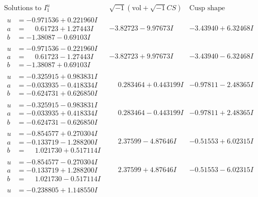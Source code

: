 \documentclass[1p]{elsarticle_modified}
\theoremstyle{definition}
\newcommand{\I}{\sqrt{-1}}
\begin{document}
$$\begin{array}{c|c|c}  
\text{Solutions to }I^u_{1}& \I (\text{vol} + \sqrt{-1}CS) & \text{Cusp shape}\\
 \hline 
\begin{aligned}
u &= -0.971536 + 0.221960 I \\
a &= \phantom{-}0.61723 + 1.27443 I \\
b &= -1.38087 - 0.69103 I\end{aligned}
 & -3.82723 - 9.97673 I & -3.43940 + 6.32468 I \\ \hline\begin{aligned}
u &= -0.971536 - 0.221960 I \\
a &= \phantom{-}0.61723 - 1.27443 I \\
b &= -1.38087 + 0.69103 I\end{aligned}
 & -3.82723 + 9.97673 I & -3.43940 - 6.32468 I \\ \hline\begin{aligned}
u &= -0.325915 + 0.983831 I \\
a &= -0.033935 - 0.418334 I \\
b &= -0.624731 + 0.626850 I\end{aligned}
 & \phantom{-}0.283464 + 0.443199 I & -0.97811 - 2.48365 I \\ \hline\begin{aligned}
u &= -0.325915 - 0.983831 I \\
a &= -0.033935 + 0.418334 I \\
b &= -0.624731 - 0.626850 I\end{aligned}
 & \phantom{-}0.283464 - 0.443199 I & -0.97811 + 2.48365 I \\ \hline\begin{aligned}
u &= -0.854577 + 0.270304 I \\
a &= -0.133719 - 1.288200 I \\
b &= \phantom{-}1.021730 + 0.517114 I\end{aligned}
 & \phantom{-}2.37599 - 4.87646 I & -0.51553 + 6.02315 I \\ \hline\begin{aligned}
u &= -0.854577 - 0.270304 I \\
a &= -0.133719 + 1.288200 I \\
b &= \phantom{-}1.021730 - 0.517114 I\end{aligned}
 & \phantom{-}2.37599 + 4.87646 I & -0.51553 - 6.02315 I \\ \hline\begin{aligned}
u &= -0.238805 + 1.148550 I \\

\end{aligned}
\end{array}$$
\end{document}
